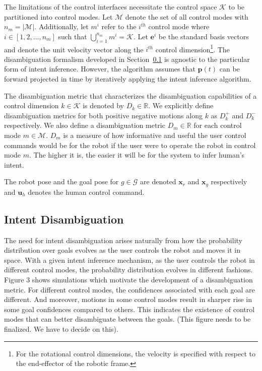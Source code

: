 The limitations of the control interfaces necessitate the control space $\mathcal{K}$ to be partitioned into control modes. Let $\mathcal{M}$ denote the set of all control modes with $n_m = \vert\mathcal{M}\vert$. Additionally, let $m^i$ refer to the $i^{th}$ control mode where $i \in [1,2,\dots,n_m]$  such that $\bigcup\limits_{i=1}^{n_m} m^i = \mathcal{K}$. Let $\boldsymbol{e}^i$ be the standard basis vectors and denote the unit velocity vector along the $i^{th}$ control dimension\footnote{For the rotational control dimensions, the velocity is specified with respect to the end-effector of the robotic frame.}. The disambiguation formalism developed in Section~\ref{ssec:disamb} is agnostic to the particular form of intent inference. However, the algorithm assumes that $\boldsymbol{p}(t)$ can be forward projected in time by iteratively applying the intent inference algorithm. 

The disambiguation metric that characterizes the disambiguation capabilities of a control dimension $k \in \mathcal{K}$ is denoted by $D_k \in \mathbb{R}$. We explicitly define disambiguation metrics for both positive negative motions along $k$ as $D_k^{+}$ and $D_k^{-}$ respectively. We also define a disambiguation metric $D_m \in \mathbb{R}$ for each control mode $m \in \mathcal{M}$. $D_m$ is a measure of how informative and useful the user control commands would be for the robot if the user were to operate the robot in control mode $m$. The higher it is, the easier it will be for the system to infer human's intent. 

The robot pose and the goal pose for $g \in \mathcal{G}$ are denoted $\boldsymbol{x}_r$ and $\boldsymbol{x}_g$ respectively and $\boldsymbol{u}_h$ denotes the human control command.
\subsection{Intent Disambiguation}\label{ssec:disamb} 
The need for intent disambiguation arises naturally from how the probability distribution over goals evolves as the user controls the robot and moves it in space. With a given intent inference mechanism, as the user controls the robot in different control modes, the probability distribution evolves in different fashions. Figure 3 shows simulations which motivate the development of a disambiguation metric. For different control modes, the confidences associated with each goal are different. And moreover, motions in some control modes result in sharper rise in some goal confidences compared to others. This indicates the existence of control modes that can better disambiguate between the goals. (This figure needs to be finalized. We have to decide on this). 

